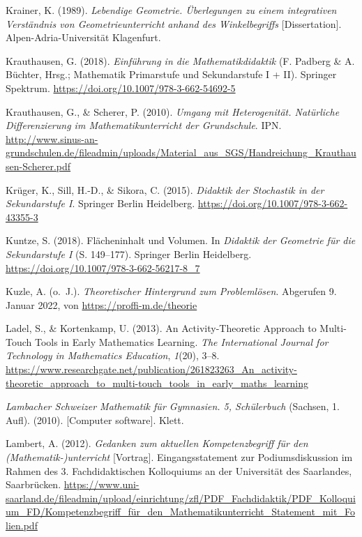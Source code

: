 \documentclass[
]{scrbook}
\newlength{\cslhangindent}
\newlength{\cslentryspacingunit} %
\newenvironment{CSLReferences}[2] %
 {%
  \setlength{\parindent}{0pt}
  \ifodd #1
  \let\oldpar\par
  \def\par{\hangindent=\cslhangindent\oldpar}
  \fi
  \setlength{\parskip}{#2\cslentryspacingunit}
 }%
 {}
\theoremstyle{definition}
\theoremstyle{definition}
\theoremstyle{definition}
\theoremstyle{definition}
\theoremstyle{remark}
\begin{document}
\begin{CSLReferences}{1}{0}
\leavevmode{}%
Krainer, K. (1989). \emph{Lebendige {Geometrie}. Überlegungen zu einem integrativen {Verständnis} von {Geometrieunterricht} anhand des {Winkelbegriffs}} {[}Dissertation{]}. Alpen-Adria-Universität Klagenfurt.

\leavevmode{}%
Krauthausen, G. (2018). \emph{Einführung in die {Mathematikdidaktik}} (F. Padberg \& A. Büchter, Hrsg.; Mathematik Primarstufe und Sekundarstufe I + II). Springer Spektrum. \url{https://doi.org/10.1007/978-3-662-54692-5}

\leavevmode{}%
Krauthausen, G., \& Scherer, P. (2010). \emph{Umgang mit {Heterogenität}. {Natürliche} {Differenzierung} im {Mathematikunterricht} der {Grundschule}}. IPN. \url{http://www.sinus-an-grundschulen.de/fileadmin/uploads/Material_aus_SGS/Handreichung_Krauthausen-Scherer.pdf}

\leavevmode{}%
Krüger, K., Sill, H.-D., \& Sikora, C. (2015). \emph{Didaktik der {Stochastik} in der {Sekundarstufe} {I}}. Springer Berlin Heidelberg. \url{https://doi.org/10.1007/978-3-662-43355-3}

\leavevmode{}%
Kuntze, S. (2018). Flächeninhalt und {Volumen}. In \emph{Didaktik der {Geometrie} für die {Sekundarstufe} {I}} (S. 149--177). Springer Berlin Heidelberg. \url{https://doi.org/10.1007/978-3-662-56217-8_7}

\leavevmode{}%
Kuzle, A. (o.~J.). \emph{Theoretischer {Hintergrund} zum {Problemlösen}}. Abgerufen 9. Januar 2022, von \url{https://proffi-m.de/theorie}

\leavevmode{}%
Ladel, S., \& Kortenkamp, U. (2013). An {Activity}-{Theoretic} {Approach} to {Multi}-{Touch} {Tools} in {Early} {Mathematics} {Learning}. \emph{The International Journal for Technology in Mathematics Education}, \emph{1}(20), 3--8. \url{https://www.researchgate.net/publication/261823263_An_activity-theoretic_approach_to_multi-touch_tools_in_early_maths_learning}

\leavevmode{}%
\emph{Lambacher {Schweizer} {Mathematik} für {Gymnasien}. 5, {Schülerbuch}} (Sachsen, 1. Aufl). (2010). {[}Computer software{]}. Klett.

\leavevmode{}%
Lambert, A. (2012). \emph{Gedanken zum aktuellen {Kompetenzbegriff} für den ({Mathematik}-)unterricht} {[}Vortrag{]}. Eingangsstatement zur Podiumsdiskussion im Rahmen des 3. Fachdidaktischen Kolloquiums an der Universität des Saarlandes, Saarbrücken. \url{https://www.uni-saarland.de/fileadmin/upload/einrichtung/zfl/PDF_Fachdidaktik/PDF_Kolloquium_FD/Kompetenzbegriff_für_den_Mathematikunterricht_Statement_mit_Folien.pdf}


\end{CSLReferences}
\end{document}
